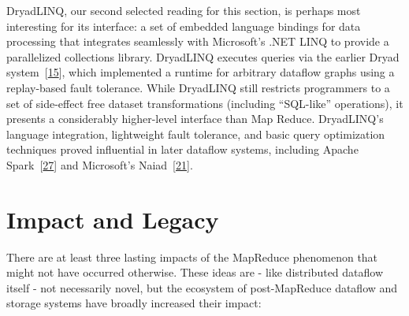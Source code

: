 \documentclass[b5paper,11pt,twoside,openright]{book}
\newcommand\Section[2]{
  \hypertarget{#1}{
    \section{#2}\label{#1}
  }
}
\begin{document}
DryadLINQ, our second selected reading for this section, is perhaps most
interesting for its interface: a set of embedded language bindings for
data processing that integrates seamlessly with Microsoft's .NET LINQ to
provide a parallelized collections library. DryadLINQ executes queries
via the earlier Dryad system~{{[}\protect\hyperlink{ref-dryad}{15}{]}},
which implemented a runtime for arbitrary dataflow graphs using a
replay-based fault tolerance. While DryadLINQ still restricts
programmers to a set of side-effect free dataset transformations
(including ``SQL-like'' operations), it presents a considerably
higher-level interface than Map Reduce. DryadLINQ's language
integration, lightweight fault tolerance, and basic query optimization
techniques proved influential in later dataflow systems, including
Apache Spark~{{[}\protect\hyperlink{ref-spark}{27}{]}} and Microsoft's
Naiad~{{[}\protect\hyperlink{ref-naiad}{21}{]}}.

\Section{impact-and-legacy}{%
Impact and Legacy
}

There are at least three lasting impacts of the MapReduce phenomenon
that might not have occurred otherwise. These ideas are - like
distributed dataflow itself - not necessarily novel, but the ecosystem
of post-MapReduce dataflow and storage systems have broadly increased
their impact:
\end{document}
